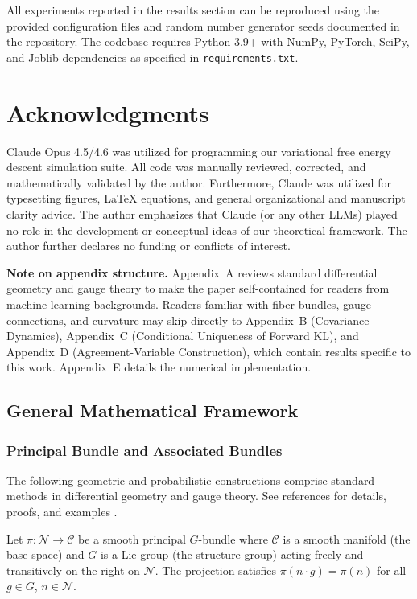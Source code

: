 \documentclass[twoside,11pt]{article}
\begin{document}
All experiments reported in the results section can be reproduced using the provided configuration files and random number generator seeds documented in the repository. The codebase requires Python 3.9+ with NumPy, PyTorch, SciPy, and Joblib dependencies as specified in \texttt{requirements.txt}.



\section*{Acknowledgments}
Claude Opus 4.5/4.6 was utilized for programming our variational free energy descent simulation suite.  All code was manually reviewed, corrected, and mathematically validated by the author.  Furthermore, Claude was utilized for typesetting figures, LaTeX equations, and general organizational and manuscript clarity advice.  The author emphasizes that Claude (or any other LLMs) played no role in the development or conceptual ideas of our theoretical framework. The author further declares no funding or conflicts of interest.

\appendix

\textbf{Note on appendix structure.} Appendix~A reviews standard differential geometry and gauge theory to make the paper self-contained for readers from machine learning backgrounds. Readers familiar with fiber bundles, gauge connections, and curvature may skip directly to Appendix~B (Covariance Dynamics), Appendix~C (Conditional Uniqueness of Forward KL), and Appendix~D (Agreement-Variable Construction), which contain results specific to this work. Appendix~E details the numerical implementation.

\subsection{General Mathematical Framework}
\subsubsection{Principal Bundle and Associated Bundles}

The following geometric and probabilistic constructions comprise standard methods in differential geometry and gauge theory.  See references for details, proofs, and examples \citep{nakahara2003geometry,frankel2011geometry,blei2017variational,amari2016information}.

Let $\pi: \mathcal{N} \to \mathcal{C}$ be a smooth principal $G$-bundle where $\mathcal{C}$ is a smooth manifold (the base space) and $G$ is a Lie group (the structure group) acting freely and transitively on the right on $\mathcal{N}$. The projection satisfies $\pi(n \cdot g) = \pi(n)$ for all $g \in G$, $n \in \mathcal{N}$.
\end{document}
